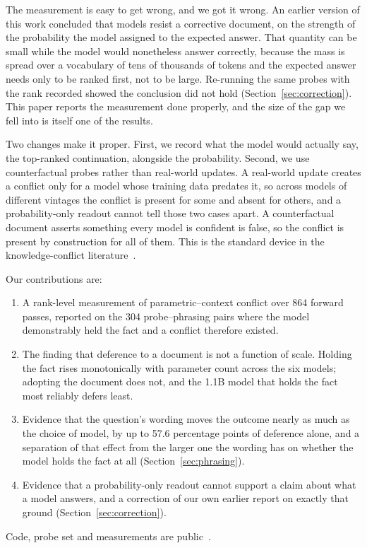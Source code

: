 \documentclass[10pt,conference]{IEEEtran}
\begin{document}
The measurement is easy to get wrong, and we got it wrong. An earlier version of this work concluded that models resist a corrective document, on the strength of the probability the model assigned to the expected answer. That quantity can be small while the model would nonetheless answer correctly, because the mass is spread over a vocabulary of tens of thousands of tokens and the expected answer needs only to be ranked first, not to be large. Re-running the same probes with the rank recorded showed the conclusion did not hold (Section~\ref{sec:correction}). This paper reports the measurement done properly, and the size of the gap we fell into is itself one of the results.

Two changes make it proper. First, we record what the model would actually say, the top-ranked continuation, alongside the probability. Second, we use counterfactual probes rather than real-world updates. A real-world update creates a conflict only for a model whose training data predates it, so across models of different vintages the conflict is present for some and absent for others, and a probability-only readout cannot tell those two cases apart. A counterfactual document asserts something every model is confident is false, so the conflict is present by construction for all of them. This is the standard device in the knowledge-conflict literature~\cite{longpre2021entity,xie2024conflicts}.

Our contributions are:
\begin{enumerate}
\item A rank-level measurement of parametric--context conflict over 864 forward passes, reported on the 304 probe--phrasing pairs where the model demonstrably held the fact and a conflict therefore existed.
\item The finding that deference to a document is not a function of scale. Holding the fact rises monotonically with parameter count across the six models; adopting the document does not, and the 1.1B model that holds the fact most reliably defers least.
\item Evidence that the question's wording moves the outcome nearly as much as the choice of model, by up to 57.6 percentage points of deference alone, and a separation of that effect from the larger one the wording has on whether the model holds the fact at all (Section~\ref{sec:phrasing}).
\item Evidence that a probability-only readout cannot support a claim about what a model answers, and a correction of our own earlier report on exactly that ground (Section~\ref{sec:correction}).
\end{enumerate}
Code, probe set and measurements are public~\cite{thakur2026code}.
\end{document}

